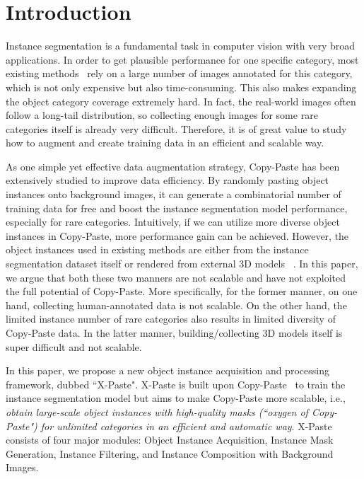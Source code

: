 \documentclass{article}
\begin{document}
\section{Introduction}
\label{sec:intro}

Instance segmentation \cite{dai2016instance,he2017mask,hafiz2020survey} is a fundamental task in computer vision with very broad applications. In order to get plausible performance for one specific category, most existing methods~\cite{li2022mask,dong2022cswin,Swin,he2017mask} rely on a large number of images annotated for this category, which is not only expensive but also time-consuming. This also makes expanding the object category coverage extremely hard. In fact, the real-world images often follow a long-tail distribution, so collecting enough images for some rare categories itself is already very difficult. Therefore, it is of great value to study how to augment and create training data in an efficient and scalable way.     


As one simple yet effective data augmentation strategy, Copy-Paste \cite{Copy-Paste,Simple-Copy-Paste,Contextual-Copy-Paste} has been extensively studied to improve data efficiency. By randomly pasting object instances onto background images, it can generate a combinatorial number of training data for free and boost the instance segmentation model performance, especially for rare categories. Intuitively, if we can utilize more diverse object instances in Copy-Paste, more performance gain can be achieved. However, the object instances used in existing methods are either from the instance segmentation dataset itself \cite{Simple-Copy-Paste,Contextual-Copy-Paste} or rendered from external 3D models ~\cite{Copy-Paste}. In this paper, we argue that both these two manners are not scalable and have not exploited the full potential of Copy-Paste. More specifically, for the former manner, on one hand, collecting human-annotated data is not scalable. On the other hand, the limited instance number of rare categories also results in limited diversity of Copy-Paste data. In the latter manner, building/collecting 3D models itself is super difficult and not scalable.    

In this paper, we propose a new object instance acquisition and processing framework, dubbed ``X-Paste". X-Paste is built upon Copy-Paste~\cite{Simple-Copy-Paste} to train the instance segmentation model but aims to make Copy-Paste more scalable, i.e., \emph{obtain large-scale object instances with high-quality masks (``oxygen of Copy-Paste") for unlimited categories in an efficient and automatic way}. X-Paste consists of four major modules: 
Object Instance Acquisition, Instance Mask Generation, Instance Filtering, and Instance Composition with Background Images. 
\end{document}
